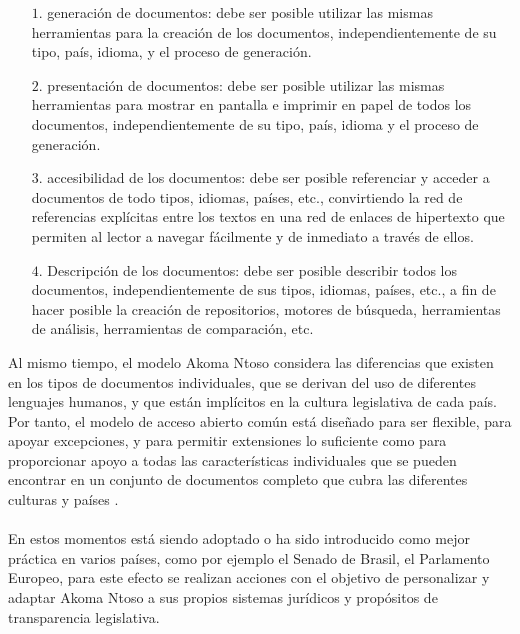 \documentclass[conference]{IEEEtran}\usepackage[]{graphicx}\usepackage[]{color}
\begin{document}
\begin{itemize}  
	\item[$1.$]	generación de documentos: debe ser posible utilizar las mismas herramientas para la creación de los documentos, independientemente de su tipo, país, idioma, y el proceso de generación.
	\item[$2.$]	presentación de documentos: debe ser posible utilizar las mismas herramientas para mostrar en pantalla e imprimir en papel de todos los documentos, independientemente de su tipo, país, idioma y el proceso de generación.
	\item[$3.$]	accesibilidad de los documentos: debe ser posible referenciar y acceder a documentos de todo tipos, idiomas, países, etc., convirtiendo la red de referencias explícitas entre los textos en una red de enlaces de hipertexto que permiten al lector a navegar fácilmente y de inmediato a través de ellos.
	\item[$4.$]	Descripción de los documentos: debe ser posible describir todos los documentos, independientemente de sus tipos, idiomas, países, etc., a fin de hacer posible la creación de repositorios, motores de búsqueda, herramientas de análisis, herramientas de comparación, etc.\\
\end{itemize}    
Al mismo tiempo, el modelo Akoma Ntoso considera las diferencias que existen en los tipos de documentos individuales, que se derivan del uso de diferentes lenguajes humanos, y que están implícitos en la cultura legislativa de cada país. Por tanto, el modelo de acceso abierto común está diseñado para ser flexible, para apoyar excepciones, y para permitir extensiones lo suficiente como para proporcionar apoyo a todas las características individuales que se pueden encontrar en un conjunto de documentos completo que cubra las diferentes culturas y países \cite{biblio11}.\\ \\
En estos momentos está siendo adoptado o ha sido introducido como mejor práctica en varios países, como por ejemplo el Senado de Brasil, el Parlamento Europeo, para este efecto se realizan acciones con el objetivo de personalizar y adaptar Akoma Ntoso a sus propios sistemas jurídicos y propósitos de transparencia legislativa. 


\end{document}
